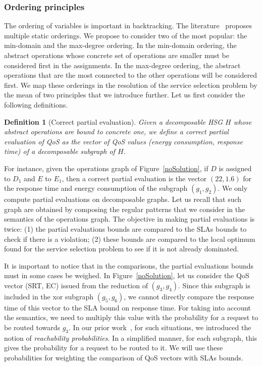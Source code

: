 \documentclass[a4paper]{article}
\newtheorem{definition}{Definition}
\begin{document}
\subsubsection{Ordering principles}

The ordering of variables is important in backtracking. The literature~\cite{Baker95intelligentbacktracking} proposes 
multiple static orderings. We propose to consider two of the most popular: the min-domain and the 
max-degree ordering. In the  min-domain ordering, the abstract operations whose concrete set of 
operations are smaller must be considered first in the assignments. In the max-degree ordering, the abstract operations 
that are the most connected to the other operations will be considered first. We map these orderings in the 
resolution of the service selection 
problem by the mean of two principles that we introduce further. Let us first consider the following definitions.  

\begin{definition}[Correct partial evaluation]
Given a decomposable HSG $H$ whose abstract operations are bound to concrete one, we define a correct partial evaluation 
of QoS as the vector of QoS values (energy consumption, response time) of a decomposable subgraph of $H$.  
\end{definition}

For instance, given the operations graph of Figure~\ref{noSolution}, if $D$ is assigned to $D_1$ and $E$ to $E_1$, then a 
correct partial evaluation is the vector $(22, 1.6)$ for the response time and energy consumption of 
the subgraph $(g_1, g_2)$. We only compute partial evaluations on decomposable graphs. Let us recall that 
such graph are obtained by composing the regular patterns that we consider in the semantics of the operations 
graph. The objective in making partial evaluations is twice: (1) the partial evaluations bounds are compared 
to  the SLAs bounds to check if there is a violation; (2) these bounds are compared to the local optimum found for 
the service selection problem to see if it is not already dominated. 

It is important to notice that in the comparisons, the partial evaluations bounds must in some cases be weighed. 
In  Figure~\ref{noSolution}, let us consider the QoS vector (SRT, EC) issued from the reduction of $(g_3, g_4)$. 
Since this subgraph is included in the xor subgraph $(g_5, g_6)$, we cannot directly compare the response time 
of this vector to the SLA bound on response time. For taking into account the semantics, we need to multiply this value 
with the probability for a request to be routed towards $g_3$. In our prior work~\cite{mgc2012}, for such situations, 
we introduced the notion of {\it reachability probabilities}. In a simplified manner, for each subgraph, this gives 
the probability for a request to be routed to it. We will use these probabilities for weighting the comparison of QoS 
vectors with SLAs bounds.
\end{document}
